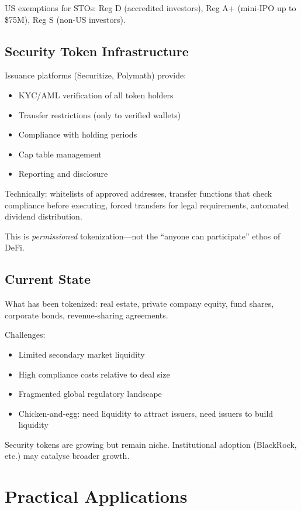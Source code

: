 \documentclass[11pt,a4paper]{article}
\begin{document}
US exemptions for STOs: Reg D (accredited investors), Reg A+ (mini-IPO up to \$75M), Reg S (non-US investors).

\subsection{Security Token Infrastructure}

Issuance platforms (Securitize, Polymath) provide:
\begin{itemize}
    \item KYC/AML verification of all token holders
    \item Transfer restrictions (only to verified wallets)
    \item Compliance with holding periods
    \item Cap table management
    \item Reporting and disclosure
\end{itemize}

Technically: whitelists of approved addresses, transfer functions that check compliance before executing, forced transfers for legal requirements, automated dividend distribution.

This is \textit{permissioned} tokenization---not the ``anyone can participate'' ethos of DeFi.

\subsection{Current State}

What has been tokenized: real estate, private company equity, fund shares, corporate bonds, revenue-sharing agreements.

Challenges:
\begin{itemize}
    \item Limited secondary market liquidity
    \item High compliance costs relative to deal size
    \item Fragmented global regulatory landscape
    \item Chicken-and-egg: need liquidity to attract issuers, need issuers to build liquidity
\end{itemize}

Security tokens are growing but remain niche. Institutional adoption (BlackRock, etc.) may catalyse broader growth.

\section{Practical Applications}
\end{document}
